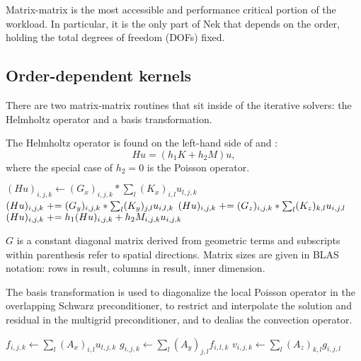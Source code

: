 Matrix-matrix is the most accessible and performance critical portion of the workload.
In particular, it is the only part of Nek that depends on the order, holding the
total degrees of freedom (DOFs) fixed.

\subsection{Order-dependent kernels}
\label{sec:operators}
There are two matrix-matrix routines that sit inside of the iterative solvers: the Helmholtz operator and a basis transformation.

The Helmholtz operator is found on the left-hand side of  and :
$$ H u = (h_1 K + h_2 M) u, $$
where the special case of $h_2 = 0$ is the Poisson operator.
\begin{algorithmic}[1] \small
{}
\State $(H u)_{i,j,k} \gets (G_x)_{i,j,k} * \sum_l (K_x)_{i,l} u_{l,j,k} $
\State $(Hu)_{i,j,k} \mathrel{+}= (G_y)_{i,j,k} * \sum_l (K_y)_{j,l} u_{i,l,k}  $
\EndFor
\State $(Hu)_{i,j,k} \mathrel{+}= (G_z)_{i,j,k} * \sum_l (K_z)_{k,l} u_{i,j,l}  $
\State $(Hu)_{i,j,k} \mathrel{+}= h_1 (Hu)_{i,j,k} + h_2 M_{i,j,k} u_{i,j,k} $
\EndProcedure
\end{algorithmic}
$G$ is a constant diagonal matrix derived from geometric terms and subscripts within parenthesis refer to spatial directions.
Matrix sizes are given in BLAS notation: rows in result, columns in result, inner dimension.

The basis transformation is used to diagonalize the local Poisson operator in the overlapping Schwarz preconditioner, to restrict and interpolate the solution and residual in the multigrid preconditioner, and to dealias the convection operator.
\begin{algorithmic}[1]
\State $f_{i,j,k} \gets \sum_l (A_x)_{i,l} u_{l,j,k}$
\State $g_{i,j,k} \gets \sum_l (A_y)_{j,l} f_{i,l,k}$
\EndFor
\State $v_{i,j,k} \gets \sum_l (A_z)_{k,l} g_{i,j,l}$
\EndProcedure
\end{algorithmic}

